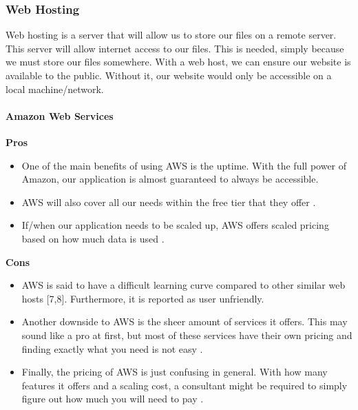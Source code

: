 \subsubsection{Web Hosting}
Web hosting is a server that will allow us to store our files on a remote server. This server will allow internet access to our files. This is needed, simply because we must store our files somewhere. With a web host, we can ensure our website is available to the public. Without it, our website would only be accessible on a local machine/network.
	\paragraph{Amazon Web Services}	
		\textbf{Pros}
			\begin{itemize}
				\item One of the main benefits of using AWS is the uptime. With the full power of Amazon, our application is almost guaranteed to always be accessible. 
				\item AWS will also cover all our needs within the free tier that they offer \cite{amazon}. 
				\item If/when our application needs to be scaled up, AWS offers scaled pricing based on how much data is used \cite{amazon}.
			\end{itemize}
		\textbf{Cons}
			\begin{itemize}
				\item AWS is said to have a difficult learning curve compared to other similar web hosts [7,8]. Furthermore, it is reported as user unfriendly. 
				\item Another downside to AWS is the sheer amount of services it offers. This may sound like a pro at first, but most of these services have their own pricing and finding exactly what you need is not easy \cite{aws}. 
				\item Finally, the pricing of AWS is just confusing in general. With how many features it offers and a scaling cost, a consultant might be required to simply figure out how much you will need to pay \cite{aws}.
			\end{itemize}
			
